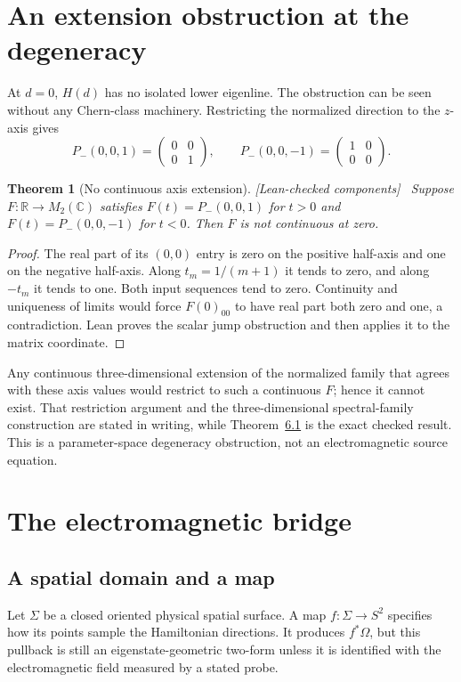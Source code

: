 \documentclass[11pt]{article}
\newtheorem{theorem}{Theorem}[section]
\theoremstyle{definition}\newtheorem{definition}[theorem]{Definition}
\theoremstyle{remark}\newtheorem{remark}[theorem]{Remark}
\newcommand{\R}{\mathbb{R}}
\newcommand{\C}{\mathbb{C}}
\newcommand{\checked}{\textnormal{\small[Lean-checked components]}\ }
\begin{document}
\section{An extension obstruction at the degeneracy}
At $d=0$, $H(d)$ has no isolated lower eigenline. The obstruction can be seen without any Chern-class machinery. Restricting the normalized direction to the $z$-axis gives
\hypertarget{eq:axis}{}
\begin{equation}
 P_-(0,0,1)=\begin{pmatrix}0&0\\0&1\end{pmatrix},\qquad
 P_-(0,0,-1)=\begin{pmatrix}1&0\\0&0\end{pmatrix}.
\end{equation}
\begin{theorem}[No continuous axis extension]\label{thm:axis}\checked
Suppose $F:\R\to M_2(\C)$ satisfies $F(t)=P_-(0,0,1)$ for $t>0$ and $F(t)=P_-(0,0,-1)$ for $t<0$. Then $F$ is not continuous at zero.
\end{theorem}
\begin{proof}
The real part of its $(0,0)$ entry is zero on the positive half-axis and one on the negative half-axis. Along $t_m=1/(m+1)$ it tends to zero, and along $-t_m$ it tends to one. Both input sequences tend to zero. Continuity and uniqueness of limits would force $F(0)_{00}$ to have real part both zero and one, a contradiction. Lean proves the scalar jump obstruction and then applies it to the matrix coordinate.
\end{proof}
Any continuous three-dimensional extension of the normalized family that agrees with these axis values would restrict to such a continuous $F$; hence it cannot exist. That restriction argument and the three-dimensional spectral-family construction are stated in writing, while Theorem~\hyperref[thm:axis]{6.1} is the exact checked result. This is a parameter-space degeneracy obstruction, not an electromagnetic source equation.

\section{The electromagnetic bridge}\label{sec:physical}
\subsection{A spatial domain and a map}
Let $\Sigma$ be a closed oriented physical spatial surface. A map $f:\Sigma\to S^2$ specifies how its points sample the Hamiltonian directions. It produces $f^*\Omega$, but this pullback is still an eigenstate-geometric two-form unless it is identified with the electromagnetic field measured by a stated probe.
\end{document}

